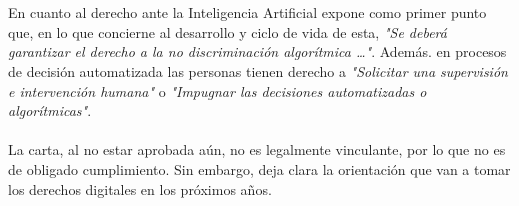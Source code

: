 \begin{refsection}
\\ \\
En cuanto al derecho ante la Inteligencia Artificial expone como primer punto que, en lo que concierne al desarrollo y ciclo de vida de esta, \textit{"Se deberá garantizar el derecho a la no discriminación algorítmica …"}. Además. en procesos de decisión automatizada las personas tienen derecho a \textit{"Solicitar una supervisión e intervención humana"} o \textit{"Impugnar las decisiones automatizadas o algorítmicas"}.
\\ \\
La carta, al no estar aprobada aún, no es legalmente vinculante, por lo que no es de obligado cumplimiento. Sin embargo, deja clara la orientación que van a tomar los derechos digitales en los próximos años.

\newpage
\thispagestyle{empty}
\cleardoublepage
\printbibliography[heading=subbibliography]

\end{refsection}

